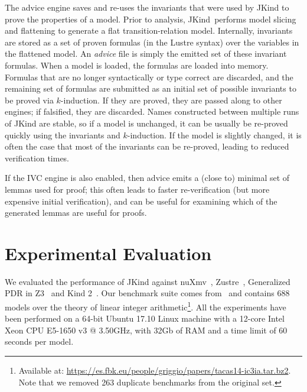 \documentclass{llncs}
\newcommand{\jkind}{{\sc JKind}\xspace}
\newcommand{\kind}{{\sc Kind}\xspace}
\newcommand{\lustre}{{\sc Lustre}\xspace}
\newcommand{\nuxmv}{{\sc nuXmv}\xspace}
\newcommand{\zustre}{{\sc Zustre}\xspace}
\newcommand{\zthree}{{\sc Z3}\xspace}
\renewcommand{\paragraph}[1]{\vspace{5pt}\noindent {\bf #1}}
\begin{document}
\paragraph{Advice.} The advice engine saves and re-uses the invariants that were used by \jkind to prove the properties of a model.  Prior to analysis, \jkind\ performs model slicing and flattening to generate a flat transition-relation model.  Internally, invariants are stored as a set of proven formulas (in the \lustre syntax) over the variables in the flattened model.  An {\em advice} file is simply the emitted set of these invariant formulas.  When a model is loaded, the formulas are loaded into memory. Formulas that are no longer syntactically or type correct are discarded, and the remaining set of formulas are submitted as an initial set of possible invariants to be proved via $k$-induction. If they are proved, they are passed along to other engines; if falsified, they are discarded.
%
Names constructed between multiple runs of \jkind are stable, so if a
model is unchanged, it can be usually be re-proved quickly using the
invariants and $k$-induction.  If the model is slightly changed, it is
often the case that most of the invariants can be re-proved, leading
to reduced verification times.

If the IVC engine is also enabled, then advice emits a (close to) minimal set of lemmas used for proof; this often leads to faster re-verification (but more expensive initial verification), and can be useful for examining which of the generated lemmas are useful for proofs.

\section{Experimental Evaluation}
\label{sec:experiment}
We evaluated the performance of \jkind against
\nuxmv~\cite{cimatti2014tacas}, \zustre~\cite{Zustre}, Generalized PDR
in \zthree~\cite{GPDR} and \kind2~\cite{champion2016cav}. Our
benchmark suite comes from~\cite{cimatti2014tacas} and contains 688
models over the theory of linear integer arithmetic\footnote{Available
  at:
  \url{https://es.fbk.eu/people/griggio/papers/tacas14-ic3ia.tar.bz2}.
  Note that we removed 263 duplicate benchmarks from the original
  set.}.  All the experiments have been performed on a 64-bit Ubuntu
17.10 Linux machine with a 12-core Intel Xeon CPU E5-1650 v3 @
3.50GHz, with 32Gb of RAM and a time limit of 60 seconds per model.
\end{document}

